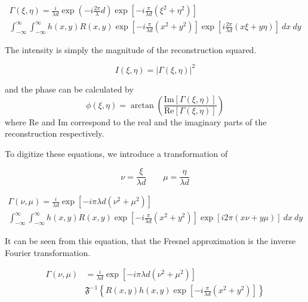     \begin{multline}
        \Gamma(\xi,\eta) = \frac{i}{\lambda d} \exp\left( -i\frac{2\pi}{\lambda}d \right)
        \exp\left[ -i\frac{\pi}{\lambda d}(\xi^2+\eta^2) \right] \\
        \int_{-\infty}^{\infty}\int_{-\infty}^{\infty}h(x,y)R(x,y)
        \exp\left[ -i\frac{\pi}{\lambda d}\left(
        x^{2}+y^{2} \right) \right]
        \exp\left[ i\frac{2\pi}{\lambda d}\left(
        x\xi+y\eta \right) \right]~dx~dy
    \end{multline}

    The intensity is simply the magnitude of the reconstruction squared.

    \begin{equation}
        I(\xi,\eta) = |\Gamma(\xi,\eta)|^{2}
    \end{equation}

    and the phase can be calculated by
    \begin{equation}
        \phi(\xi,\eta)=\arctan\left( \frac{\mathrm{Im}[\Gamma(\xi,\eta)]}{\mathrm{Re}[\Gamma(\xi,\eta)]} \right)
    \end{equation}
    where Re and Im correspond to the real and the imaginary parts of the
    reconstruction respectively.

    To digitize these equations, we introduce a transformation of

    \begin{equation}
        \nu = \frac{\xi}{\lambda d} \qquad \mu = \frac{\eta}{\lambda d}
    \end{equation}

    \begin{multline}
        \Gamma(\nu,\mu) = \frac{i}{\lambda d} 
        \exp\left[ -i\pi\lambda d(\nu^2+\mu^2) \right] \\
        \int_{-\infty}^{\infty}\int_{-\infty}^{\infty}h(x,y)R(x,y)
        \exp\left[ -i\frac{\pi}{\lambda d}\left(
        x^{2}+y^{2} \right) \right]
        \exp\left[ i2\pi\left(
        x\nu+y\mu \right) \right]~dx~dy
    \end{multline}

    It can be seen from this equation, that the Fresnel approximation is the
    inverse Fourier transformation.

    \begin{align}
        \Gamma(\nu,\mu)&=\frac{i}{\lambda d}\exp\left[ -i\pi\lambda d\left(
            \nu^2+\mu^2
        \right) \right] \\
        & \mathfrak{F}^{-1}\left\{R(x,y)h(x,y)\exp\left[
            -i\frac{\pi}{\lambda d}(x^{2}+y^2)
        \right] \right\}
    \end{align}

